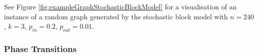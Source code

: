 \documentclass[12pt]{article}
\numberwithin{equation}{section}
\begin{document}

See Figure \ref{fig:exampleGraphStochasticBlockModel} for a visualisation of an instance of a random graph generated by the stochastic block model with $n = 240$, $k = 3$, $p_{in} = 0.2$, $p_{out} = 0.01$.


\subsubsection{Phase Transitions}
\label{sec:background;subsec:communityDetection;subsubsec:phaseTransitions}
\end{document}
